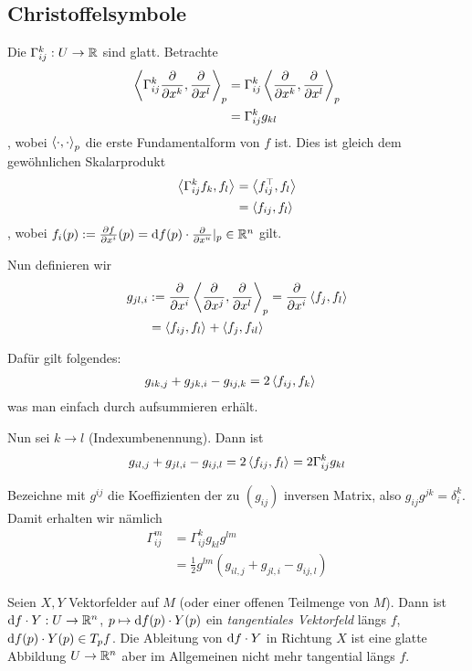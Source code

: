 \documentclass{skript}
\begin{document}
\subsection{Christoffelsymbole}
Die $\Gamma_{ij}^k:U\to\mathbb{R}$ sind glatt. Betrachte
\begin{align*}
  \sprod[p]{\Gamma^k_{ij}\frac{\partial}{\partial x^k},\frac{\partial}{\partial
  x^l}} &= \Gamma_{ij}^k\sprod[p]{\frac{\partial}{\partial
  x^k},\frac{\partial}{\partial x^l}} \\
  &= \Gamma_{ij}^kg_{kl} 
\end{align*}, wobei $\sprod[p]{\cdot,\cdot}$ die erste Fundamentalform von $f$
ist. Dies ist gleich dem gewöhnlichen Skalarprodukt
\begin{align*}
  \sprod{\Gamma^k_{ij}f_k, f_l} &= \sprod{f_{ij}^\top, f_l} \\
  &= \sprod{f_{ij}, f_{l}}
\end{align*}, wobei $f_i(p) := \frac{\partial f}{\partial x^i}(p) = \mathrm d f(p)\cdot
\frac{\partial}{\partial x^u}\vert_p \in \mathbb{R}^n$ gilt.

Nun definieren wir
\begin{align*}
  g_{jl,i} &:= \frac{\partial}{\partial x^i}\sprod[p]{\frac{\partial}{\partial
  x^j},\frac{\partial}{\partial x^l}} = \frac{\partial}{\partial x^i}\sprod{f_j,
  f_l} \\
  &= \sprod{f_{ij}, f_l} + \sprod{f_j, f_{il}}
\end{align*}

Dafür gilt folgendes:
\begin{align*}
  g_{ik,j} + g_{jk,i} - g_{ij,k} &= 2\sprod{f_{ij}, f_k}
\end{align*}
was man einfach durch aufsummieren erhält.

Nun sei $k \to l$ (Indexumbenennung). Dann ist
\begin{align*}
  g_{il,j} + g_{jl,i} - g_{ij,l} = 2\sprod{f_{ij}, f_l} = 2\Gamma^k_{ij}g_{kl}
\end{align*}

Bezeichne mit $g^{ij}$ die Koeffizienten der zu $(g_{ij})$ inversen Matrix, also
$g_{ij}g^{jk} = \delta^k_i$. Damit erhalten wir nämlich
\begin{align*}
  \Gamma^m_{ij} &= \Gamma_{ij}^kg_{kl}g^{lm} \\
  &= \frac{1}{2}g^{lm}\left(g_{il,j} + g_{jl,i} - g_{ij,l}\right)
\end{align*}

Seien $X,Y$ Vektorfelder auf $M$ (oder einer offenen Teilmenge von $M$). Dann
ist $\mathrm d f\cdot Y:U\to\mathbb{R}^n$, $p\mapsto\mathrm d f(p)\cdot Y(p)$ ein \emph{tangentiales
Vektorfeld} längs $f$, $\mathrm d f(p)\cdot Y(p)\in T_pf$. Die Ableitung von $\mathrm d f
\cdot Y$ in Richtung $X$ ist eine glatte Abbildung $U\to \mathbb{R}^n$ aber im
Allgemeinen nicht mehr tangential längs $f$.
\end{document}

